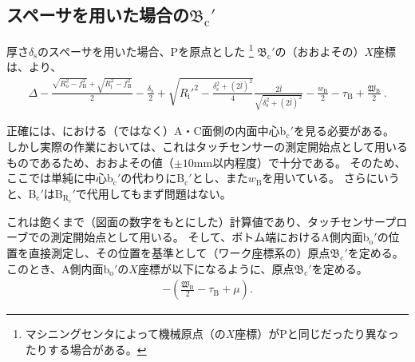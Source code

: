 \subsection[\index{スペーサ}スペーサを用いた場合の\texorpdfstring{$\mathfrak B_\mathrm c'$}{Bc'}]
           {スペーサを用いた場合の$\boldsymbol{\mathfrak B_\mathrm c'}$}
厚さ$\delta_\mathrm s$のスペーサを用いた場合、\TableCenter Pを原点とした
\footnote{マシニングセンタによって機械原点（の$X$座標）が\TableCenter Pと同じだったり異なったりする場合がある。}\relax
\BottomOutcutCenter$\mathfrak B_\mathrm c'$の（おおよその）$X$座標は、より、
\begin{align*}
  \Delta-\frac{\sqrt{R_\mathrm o^2-f_\mathrm B^2}+\sqrt{R_\mathrm i^2-f_\mathrm B^2}}2-\frac{\delta_\mathrm s}2
  +\sqrt{R_\mathrm i'^2-\frac{\delta_\mathrm s^2+(2\bar l)^2}4}\frac{2\bar l}{\sqrt{\delta_\mathrm s^2+(2\bar l)^2}}
  -\frac{w_\mathrm B}2-\tau_\mathrm B+\frac{\mathfrak W_\mathrm B}2\ .
\end{align*}
\begin{hosoku}
正確には、\nameBottomEndFace における（\InnerDiameter ではなく）A・C面側の内面中心b$_\mathrm c'$を見る必要がある。
しかし実際の作業においては、これはタッチセンサーの測定開始点として用いるものであるため、おおよその値（$\pm10$mm以内程度）で十分である。
そのため、ここでは単純に中心b$_\mathrm c'$の代わりに\BottomODCenter B$_\mathrm c'$とし、また\BottomEndACID$w_\mathrm B$を用いている。
さらにいうと、\BottomODCenter B$_\mathrm c'$は\BottomCurvatureCenter B$_{\mathrm R_\mathrm c}'$で代用してもまず問題はない。
\end{hosoku}
これは飽くまで（図面の数字をもとにした）計算値であり、タッチセンサープローブでの測定開始点として用いる。
そして、ボトム端におけるA側内面b$_\mathrm o'$の位置を直接測定し、その位置を基準として（ワーク座標系の）原点$\mathfrak B_\mathrm c'$を定める。
このとき、A側内面b$_\mathrm o'$の$X$座標が以下になるように、原点$\mathfrak B_\mathrm c'$を定める。
\begin{align*}
  -\left(\frac{\mathfrak W_\mathrm B}2-\tau_\mathrm B+\mu\right).
\end{align*}


